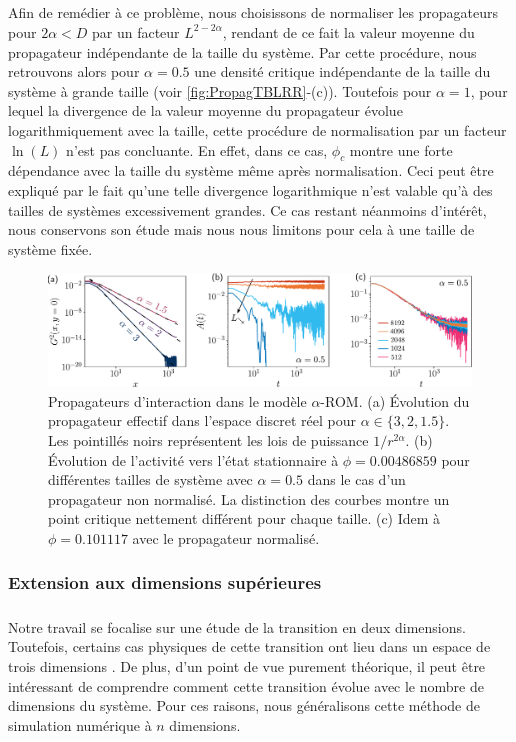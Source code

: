 \subparagraph{}Afin de remédier à ce problème, nous choisissons de normaliser les propagateurs pour $2\alpha<D$ par un facteur $L^{2-2\alpha}$, rendant de ce fait la valeur moyenne du propagateur indépendante de la taille du système. Par cette procédure, nous retrouvons alors pour $\alpha = 0.5$ une densité critique indépendante de la taille du système à grande taille (voir \autoref{fig:PropagTBLRR}-(c)). Toutefois pour $\alpha = 1$, pour lequel la divergence de la valeur moyenne du propagateur évolue logarithmiquement avec la taille, cette procédure de normalisation par un facteur $\ln (L)$ n'est pas concluante. En effet, dans ce cas, $\phi_c$ montre une forte dépendance avec la taille du système même après normalisation. Ceci peut être expliqué par le fait qu'une telle divergence logarithmique n'est valable qu'à des tailles de systèmes excessivement grandes. Ce cas restant néanmoins d'intérêt, nous conservons son étude mais nous nous limitons pour cela à une taille de système fixée.

\begin{figure}[h]
	\centering
	\includegraphics[width=\textwidth]{Chapitre3/Figures/Method/PropagTBLRR2D.pdf}
	\caption{Propagateurs d'interaction dans le modèle $\alpha$-ROM. (a) Évolution du propagateur effectif dans l'espace discret réel pour $\alpha \in \{ 3, 2, 1.5 \}$. Les pointillés noirs représentent les lois de puissance $1/r^{2\alpha}$. (b) Évolution de l'activité vers l'état stationnaire à $\phi = 0.00486859$ pour différentes tailles de système avec $\alpha = 0.5$ dans le cas d'un propagateur non normalisé. La distinction des courbes montre un point critique nettement différent pour chaque taille. (c) Idem à $\phi=0.101117$ avec le propagateur normalisé.}
	\label{fig:PropagTBLRR}
\end{figure}

\subsubsection{Extension aux dimensions supérieures}

\subparagraph{}Notre travail se focalise sur une étude de la transition en deux dimensions. Toutefois, certains cas physiques de cette transition ont lieu dans un espace de trois dimensions \cite{pine_chaos_2005}. De plus, d'un point de vue purement théorique, il peut être intéressant de comprendre comment cette transition évolue avec le nombre de dimensions du système. Pour ces raisons, nous généralisons cette méthode de simulation numérique à $n$ dimensions.

